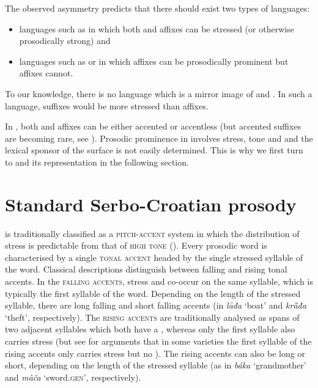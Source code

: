 \documentclass[output=paper, colorlinks, citecolor=brown, newtxmath]{langsci/langscibook}
\begin{document}
The observed asymmetry predicts that there should exist two types of languages:
\begin{itemize}
  \item languages such as  in which both  and  affixes can be stressed (or otherwise prosodically strong) and
\item languages such as  or  in which  affixes can be prosodically prominent but  affixes cannot.\end{itemize}
To our knowledge, there is no language which is a mirror image of  and . In such a language,  suffixes would be more stressed than  affixes.

In , both  and  affixes can be either accented or accentless (but accented  suffixes are becoming rare, see ). Prosodic prominence in  involves stress, tone and  and the lexical sponsor of the surface  is not easily determined. This is why we first turn to   and its representation in the following section.

\section{Standard Serbo-Croatian prosody
} \label{sec:simonovic:3}

 is traditionally classified as a \textsc{pitch-accent} system in which the distribution of stress is predictable from that of \textsc{high tone} (\citealt{Zec1988, Zec1999}). Every prosodic word is characterised by a single \textsc{tonal accent} headed by the single stressed syllable of the word. Classical descriptions distinguish between falling and rising tonal accents. In the \textsc{falling accents}, stress and  co-occur on the same syllable, which is typically the first syllable of the word. Depending on the length of the stressed syllable, there are long falling and short falling accents (in \textit{lȃđa} `boat' and \textit{krȁđa} `theft', respectively). The \textsc{rising accents} are traditionally analysed as spans of two adjacent syllables which both have a , whereas only the first syllable also carries stress (but see \citealt{Zsiga-Zec2013} for arguments that in some varieties the first syllable of the rising accents only carries stress but no ). The rising accents can also be long or short, depending on the length of the stressed syllable (as in \textit{báka} `grandmother' and \textit{màča} `sword.\textsc{gen}', respectively).
\end{document}
